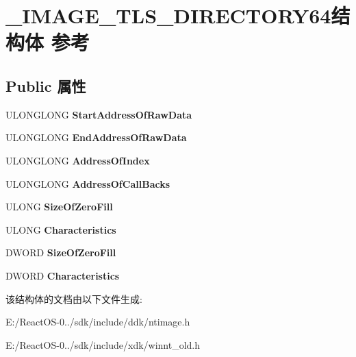 \hypertarget{struct___i_m_a_g_e___t_l_s___d_i_r_e_c_t_o_r_y64}{}\section{\+\_\+\+I\+M\+A\+G\+E\+\_\+\+T\+L\+S\+\_\+\+D\+I\+R\+E\+C\+T\+O\+R\+Y64结构体 参考}
\label{struct___i_m_a_g_e___t_l_s___d_i_r_e_c_t_o_r_y64}
\subsection*{Public 属性}
\begin{DoxyCompactItemize}
\item 
\mbox{\label{struct___i_m_a_g_e___t_l_s___d_i_r_e_c_t_o_r_y64_a7ee64440f81908fc6aacc04547651c9a}} 
U\+L\+O\+N\+G\+L\+O\+NG {\bfseries Start\+Address\+Of\+Raw\+Data}
\item 
\mbox{\label{struct___i_m_a_g_e___t_l_s___d_i_r_e_c_t_o_r_y64_ab61fb7c9f49cd50d98edb94ab1aeea4f}} 
U\+L\+O\+N\+G\+L\+O\+NG {\bfseries End\+Address\+Of\+Raw\+Data}
\item 
\mbox{\label{struct___i_m_a_g_e___t_l_s___d_i_r_e_c_t_o_r_y64_aeb338678cb68dc21f9cecf8852c8612c}} 
U\+L\+O\+N\+G\+L\+O\+NG {\bfseries Address\+Of\+Index}
\item 
\mbox{\label{struct___i_m_a_g_e___t_l_s___d_i_r_e_c_t_o_r_y64_a452bbe7cedad14cf65c398c431b1eaab}} 
U\+L\+O\+N\+G\+L\+O\+NG {\bfseries Address\+Of\+Call\+Backs}
\item 
\mbox{\label{struct___i_m_a_g_e___t_l_s___d_i_r_e_c_t_o_r_y64_a097dab4e1033c4641d274d853791348b}} 
U\+L\+O\+NG {\bfseries Size\+Of\+Zero\+Fill}
\item 
\mbox{\label{struct___i_m_a_g_e___t_l_s___d_i_r_e_c_t_o_r_y64_a3620199a2857d5cf42c491a87c103286}} 
U\+L\+O\+NG {\bfseries Characteristics}
\item 
\mbox{\label{struct___i_m_a_g_e___t_l_s___d_i_r_e_c_t_o_r_y64_a559c7786966fb5feb444c670e75a273a}} 
D\+W\+O\+RD {\bfseries Size\+Of\+Zero\+Fill}
\item 
\mbox{\label{struct___i_m_a_g_e___t_l_s___d_i_r_e_c_t_o_r_y64_a0679b478596e1c465f5110c8b610de23}} 
D\+W\+O\+RD {\bfseries Characteristics}
\end{DoxyCompactItemize}


该结构体的文档由以下文件生成\+:\begin{DoxyCompactItemize}
\item 
E\+:/\+React\+O\+S-\/0../sdk/include/ddk/ntimage.\+h\item 
E\+:/\+React\+O\+S-\/0../sdk/include/xdk/winnt\+\_\+old.\+h\end{DoxyCompactItemize}
